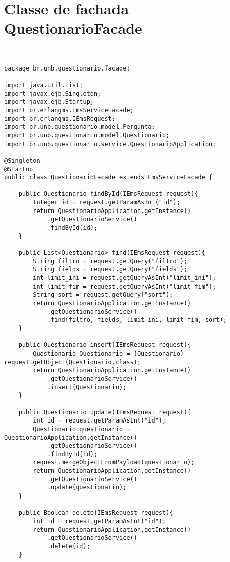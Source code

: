 \section{Classe de fachada QuestionarioFacade}



             
\begin{lstlisting} 


package br.unb.questionario.facade;

import java.util.List;
import javax.ejb.Singleton;
import javax.ejb.Startup;
import br.erlangms.EmsServiceFacade;
import br.erlangms.IEmsRequest;
import br.unb.questionario.model.Pergunta;
import br.unb.questionario.model.Questionario;
import br.unb.questionario.service.QuestionarioApplication;
 
@Singleton
@Startup
public class QuestionarioFacade extends EmsServiceFacade {

	public Questionario findById(IEmsRequest request){
		Integer id = request.getParamAsInt("id");
		return QuestionarioApplication.getInstance()
			.getQuestionarioService()
			.findById(id);
	}
	
	public List<Questionario> find(IEmsRequest request){
		String filtro = request.getQuery("filtro");
		String fields = request.getQuery("fields");
		int limit_ini = request.getQueryAsInt("limit_ini");
		int limit_fim = request.getQueryAsInt("limit_fim");
		String sort = request.getQuery("sort");
		return QuestionarioApplication.getInstance()
			.getQuestionarioService()
			.find(filtro, fields, limit_ini, limit_fim, sort);
	}

	public Questionario insert(IEmsRequest request){
		Questionario Questionario = (Questionario) request.getObject(Questionario.class);
		return QuestionarioApplication.getInstance()
			.getQuestionarioService()
			.insert(Questionario);
	}
	
	public Questionario update(IEmsRequest request){
		int id = request.getParamAsInt("id");
		Questionario questionario = QuestionarioApplication.getInstance()
			.getQuestionarioService()
			.findById(id);
		request.mergeObjectFromPayload(questionario);
		return QuestionarioApplication.getInstance()
			.getQuestionarioService()
			.update(questionario);
	}
	
	public Boolean delete(IEmsRequest request){
		int id = request.getParamAsInt("id");
		return QuestionarioApplication.getInstance()
			.getQuestionarioService()
			.delete(id);
	}


\end{lstlisting}
